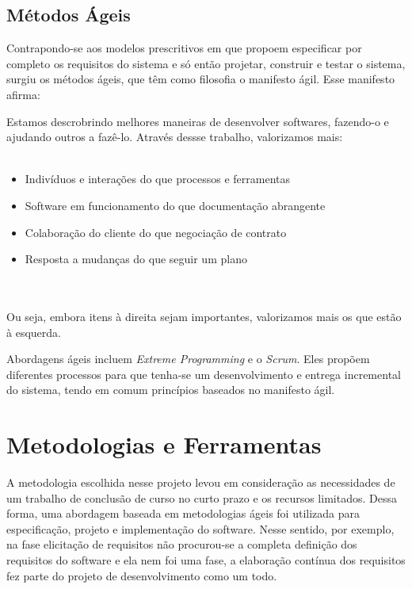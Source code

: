 \subsection{Métodos Ágeis}

Contrapondo-se aos modelos prescritivos em que propoem especificar por completo
os requisitos do sistema e só então projetar, construir e testar o sistema, surgiu
os métodos ágeis, que têm como filosofia o manifesto ágil. Esse manifesto afirma:

\begin{citacao}
  Estamos descrobrindo melhores maneiras de desenvolver softwares, fazendo-o e ajudando
  outros a fazê-lo. Através dessse trabalho, valorizamos mais:\\\\
  \begin{minipage}{15cm}
    \begin{itemize}
      \item Indivíduos e interações do que processos e ferramentas
      \item Software em funcionamento do que documentação abrangente
      \item Colaboração do cliente do que negociação de contrato
      \item Resposta a mudanças do que seguir um plano
    \end{itemize}
  \end{minipage}\\\\
  Ou seja, embora itens à direita sejam importantes, valorizamos mais os que estão à esquerda.
\end{citacao}

Abordagens ágeis incluem \textit{Extreme Programming} e o \textit{Scrum}. Eles propõem diferentes processos
para que tenha-se um desenvolvimento e entrega incremental do sistema, tendo em comum princípios
baseados no manifesto ágil.

\section{Metodologias e Ferramentas}

A metodologia escolhida nesse projeto levou em consideração as necessidades de um trabalho de
conclusão de curso no curto prazo e os recursos limitados. Dessa forma, uma abordagem baseada em metodologias ágeis foi utilizada para %
especificação, projeto e implementação do software. Nesse sentido, por exemplo,
na fase elicitação de requisitos não procurou-se a completa definição dos requisitos do software e ela nem foi
uma fase, a elaboração contínua dos requisitos fez parte do projeto de desenvolvimento como um todo.

